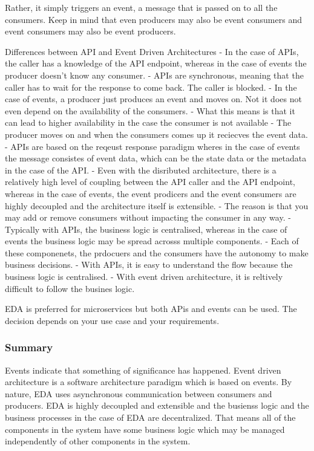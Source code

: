 \documentclass[a4paper, 11pt]{book}
\begin{document}
{    Rather, it simply triggers an event, a message that is passed on to all the consumers.
    Keep in mind that even producers may also be event consumers and event consumers may also be event producers.


    Differences between API and Event Driven Architectures
    - In the case of APIs, the caller has a knowledge of the API endpoint, whereas in the case of events the producer doesn't know any consumer.
    - APIs are synchronous, meaning that the caller has to wait for the response to come back. The caller is blocked.
    - In the case of events, a producer just produces an event and moves on. Not it does not even depend on the availability of the consumers.
        - What this means is that it can lead to higher availability in the case the consumer is not available
        - The producer moves on and when the consumers comes up it reciecves the event data.
    - APIs are based on the reqeust response paradigm wheres in the case of events the message consistes of event data, which can be the state data or the metadata in the case of the API.
    - Even with the disributed architecture, there is a relatively high level of coupling between the API caller and the API endpoint, whereas in the case of events, the event prodicers and the event consumers are highly decoupled and the architecture itself is extensible.
        - The reason is that you may add or remove consumers without impacting the consumer in any way.
    - Typically with APIs, the business logic is centralised, whereas in the case of events the business logic may be spread acrosss multiple components.
        - Each of these componenets, the prdocuers and the consumers have the autonomy to make business decisions.
        - With APIs, it is easy to understand the flow because the business logic is centralised.
        - With event driven architecture, it is reltively difficult to follow the busines logic.

    EDA is preferred for microservices but both APis and events can be used. The decision depends on your use case and your requirements.


    \subsubsection{Summary}
    Events indicate that something of significance has happened.
    Event driven architecture is a software architecture paradigm which is based on events.
    By nature, EDA uses asynchronous communication between consumers and producers.
    EDA is highly decoupled and extensible and the busienss logic and the business processes in the case of EDA are decentralized.
    That means all of the components in the system have some business logic which may be managed independently of other components in the system.


}
\end{document}
